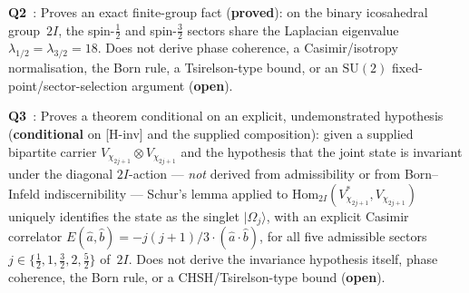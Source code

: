 \documentclass[11pt,a4paper]{article}
\newcommand{\SU}{\mathrm{SU}}
\newcommand{\sproved}{\textcolor{cproved}{\textbf{proved}}}
\newcommand{\sopen}{\textcolor{copen}{\textbf{open}}}
\newcommand{\scond}{\textcolor{ccond}{\textbf{conditional}}}
\begin{document}
    \textbf{Q2}~\cite{Beau2026q2}: Proves an exact finite-group fact (\sproved): on the binary
    icosahedral group~$2I$, the spin-$\tfrac{1}{2}$ and spin-$\tfrac{3}{2}$ sectors share the
    Laplacian eigenvalue $\lambda_{1/2} = \lambda_{3/2} = 18$. Does not derive phase coherence,
    a Casimir/isotropy normalisation, the Born rule, a Tsirelson-type bound, or an $\SU(2)$
    fixed-point/sector-selection argument (\sopen).

    \textbf{Q3}~\cite{Beau2026q3}: Proves a theorem conditional on an explicit, undemonstrated
    hypothesis (\scond{} on [H-inv] and the supplied composition): given a supplied bipartite carrier
    $V_{\chi_{2j+1}}\otimes
    V_{\chi_{2j+1}}$ and the hypothesis that the joint state is invariant under the diagonal
    $2I$-action --- \emph{not} derived from admissibility or from Born--Infeld indiscernibility
    --- Schur's lemma applied to $\mathrm{Hom}_{2I}(V_{\chi_{2j+1}}^*, V_{\chi_{2j+1}})$
    uniquely identifies the state as the singlet $|\Omega_j\rangle$, with an explicit Casimir
    correlator $E(\hat{a},\hat{b}) = -j(j+1)/3\cdot(\hat{a}\cdot\hat{b})$, for all five admissible
    sectors $j \in \{\tfrac{1}{2}, 1, \tfrac{3}{2}, 2, \tfrac{5}{2}\}$ of~$2I$. Does not derive the
    invariance hypothesis itself, phase coherence, the Born rule, or a CHSH/Tsirelson-type bound
    (\sopen).
\end{document}
